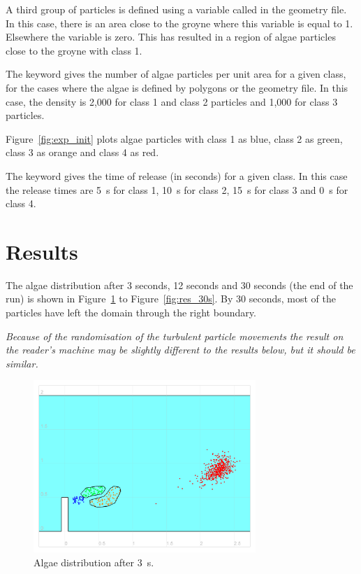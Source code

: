 \smallskip
A third group of particles is defined using a variable called
 in the geometry file.
In this case, there is an area close to the groyne where this variable is equal
to 1.
Elsewhere the variable is zero.
This has resulted in a region of algae particles close to the groyne with class 1.

\smallskip
The keyword  gives the number of algae
particles per unit area for a given class, for the cases where the algae is
defined by polygons or the geometry file.
In this case, the density is 2,000 for class 1 and class 2 particles and 1,000
for class 3 particles. 

Figure~\ref{fig:exp_init} plots algae particles with class 1 as blue, class 2 as
green, class 3 as orange and class 4 as red.

\smallskip
The keyword  gives the time of release (in
seconds) for a given class.
In this case the release times are 5~s for class 1, 10~s for class 2, 15~s for
class 3 and 0~s for class 4.

\section{Results}

The algae distribution after 3 seconds, 12 seconds and 30 seconds (the end of
the run) is shown in Figure~\ref{fig:res_3s} to Figure~\ref{fig:res_30s}.
By 30 seconds, most of the particles have left the domain through the right
boundary.

\emph{Because of the randomisation of the turbulent particle movements the
  result on the reader's machine may be slightly different to the results below, but it should be similar.}

\begin{figure}[h]
  \begin{center}
    \includegraphics[width=0.75\textwidth]{./img/canal_algae_3s_02}
  \end{center}
  \caption{Algae distribution after 3~s.}
  \label{fig:res_3s}
\end{figure}


